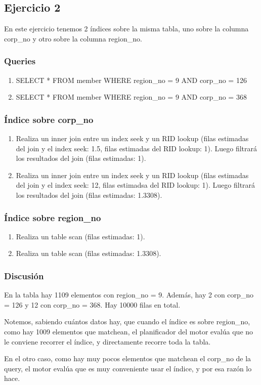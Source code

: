 \subsection{Ejercicio 2}
En este ejercicio tenemos 2 índices sobre la misma tabla, uno sobre la columna corp\_no y otro sobre la columna region\_no.

\subsubsection{Queries}

\begin{enumerate}[label=(\alph*)]
\item SELECT * FROM member WHERE region\_no = 9 AND corp\_no = 126
\item SELECT * FROM member WHERE region\_no = 9 AND corp\_no = 368
\end{enumerate}

\subsubsection{Índice sobre corp\_no}
\begin{enumerate}[label=(\alph*)]
  \item Realiza un inner join entre un index seek y un RID lookup (filas estimadas del join y el index seek: 1.5, filas estimadas del RID lookup: 1). Luego filtrará los resultados del join (filas estimadas: 1).
  \item Realiza un inner join entre un index seek y un RID lookup (filas estimadas del join y el index seek: 12, filas estimadsa del RID lookup: 1). Luego filtrará los resultados del join (filas estimadas: 1.3308).
\end{enumerate}

\subsubsection{Índice sobre region\_no}
\begin{enumerate}[label=(\alph*)]
  \item Realiza un table scan (filas estimadas: 1).
  \item Realiza un table scan (filas estimadas: 1.3308).
\end{enumerate}

\subsubsection{Discusión}

En la tabla hay 1109 elementos con region\_no = 9. Además, hay 2 con corp\_no = 126 y 12 con corp\_no = 368. Hay 10000 filas en total.

Notemos, sabiendo cuántos datos hay, que cuando el índice es sobre region\_no, como hay 1009 elementos que matchean, el planificador del motor evalúa que no le conviene recorrer el índice, y directamente recorre toda la tabla.

En el otro caso, como hay muy pocos elementos que matchean el corp\_no de la query, el motor evalúa que es muy conveniente usar el índice, y por esa razón lo hace.
